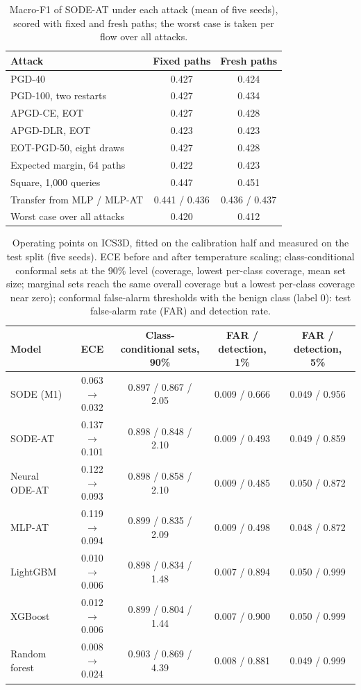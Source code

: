 \documentclass{article}
\theoremstyle{definition}
\begin{document}
\begin{table}[h]
\caption{Macro-F1 of SODE-AT under each attack (mean of five seeds), scored with
fixed and fresh paths; the worst case is taken per flow over all attacks.}
\label{tab:attacks}
\centering\small
\begin{tabular}{lcc}
\toprule
Attack & Fixed paths & Fresh paths\\
\midrule
PGD-40 & 0.427 & 0.424\\
PGD-100, two restarts & 0.427 & 0.434\\
APGD-CE, EOT & 0.427 & 0.428\\
APGD-DLR, EOT & 0.423 & 0.423\\
EOT-PGD-50, eight draws & 0.427 & 0.428\\
Expected margin, 64 paths & 0.422 & 0.423\\
Square, 1{,}000 queries & 0.447 & 0.451\\
Transfer from MLP / MLP-AT & 0.441 / 0.436 & 0.436 / 0.437\\
\midrule
Worst case over all attacks & 0.420 & 0.412\\
\bottomrule
\end{tabular}
\end{table}

\begin{table}[h]
\caption{Operating points on ICS3D, fitted on the calibration half and measured on
the test split (five seeds). ECE before and after temperature scaling;
class-conditional conformal sets at the 90\% level (coverage, lowest per-class
coverage, mean set size; marginal sets reach the same overall coverage but a
lowest per-class coverage near zero); conformal false-alarm thresholds with the
benign class (label 0): test false-alarm rate (FAR) and detection rate.}
\label{tab:alarms}
\centering\footnotesize
\setlength{\tabcolsep}{3.5pt}
\begin{tabular}{lcccc}
\toprule
Model & ECE & Class-conditional sets, 90\% & FAR / detection, 1\% & FAR / detection, 5\%\\
\midrule
SODE (M1) & 0.063 $\to$ 0.032 & 0.897 / 0.867 / 2.05 & 0.009 / 0.666 & 0.049 / 0.956\\
SODE-AT & 0.137 $\to$ 0.101 & 0.898 / 0.848 / 2.10 & 0.009 / 0.493 & 0.049 / 0.859\\
Neural ODE-AT & 0.122 $\to$ 0.093 & 0.898 / 0.858 / 2.10 & 0.009 / 0.485 & 0.050 / 0.872\\
MLP-AT & 0.119 $\to$ 0.094 & 0.899 / 0.835 / 2.09 & 0.009 / 0.498 & 0.048 / 0.872\\
LightGBM & 0.010 $\to$ 0.006 & 0.898 / 0.834 / 1.48 & 0.007 / 0.894 & 0.050 / 0.999\\
XGBoost & 0.012 $\to$ 0.006 & 0.899 / 0.804 / 1.44 & 0.007 / 0.900 & 0.050 / 0.999\\
Random forest & 0.008 $\to$ 0.024 & 0.903 / 0.869 / 4.39 & 0.008 / 0.881 & 0.049 / 0.999\\
\bottomrule
\end{tabular}
\end{table}
\end{document}
